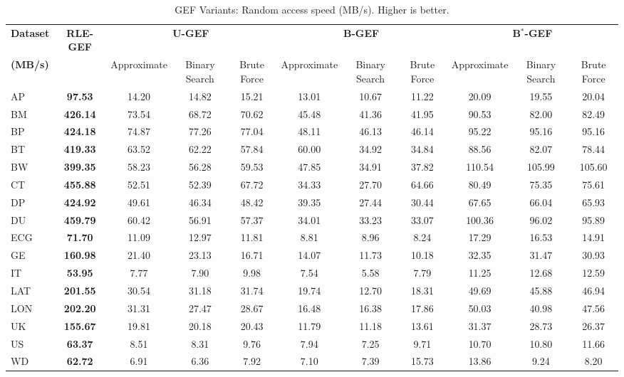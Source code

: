 \begin{table*}[htbp]
\caption{GEF Variants: Random access speed (MB/s). Higher is better.}
\label{tab:gef_access}
\centering
\small
\setlength{\tabcolsep}{4pt} %
\begin{tabular}{lcccccccccc}
\toprule
\textbf{Dataset} & \textbf{RLE-GEF} & \multicolumn{3}{c}{\textbf{U-GEF}} & \multicolumn{3}{c}{\textbf{B-GEF}} & \multicolumn{3}{c}{\textbf{B$^*$-GEF}} \\
\textbf{(MB/s)} &   & Approximate & Binary Search & Brute Force & Approximate & Binary Search & Brute Force & Approximate & Binary Search & Brute Force \\
\cmidrule(lr){3-5} \cmidrule(lr){6-8} \cmidrule(lr){9-11} 
\midrule
AP & \textbf{97.53} & 14.20 & 14.82 & 15.21 & 13.01 & 10.67 & 11.22 & 20.09 & 19.55 & 20.04 \\
BM & \textbf{426.14} & 73.54 & 68.72 & 70.62 & 45.48 & 41.36 & 41.95 & 90.53 & 82.00 & 82.49 \\
BP & \textbf{424.18} & 74.87 & 77.26 & 77.04 & 48.11 & 46.13 & 46.14 & 95.22 & 95.16 & 95.16 \\
BT & \textbf{419.33} & 63.52 & 62.22 & 57.84 & 60.00 & 34.92 & 34.84 & 88.56 & 82.07 & 78.44 \\
BW & \textbf{399.35} & 58.23 & 56.28 & 59.53 & 47.85 & 34.91 & 37.82 & 110.54 & 105.99 & 105.60 \\
CT & \textbf{455.88} & 52.51 & 52.39 & 67.72 & 34.33 & 27.70 & 64.66 & 80.49 & 75.35 & 75.61 \\
DP & \textbf{424.92} & 49.61 & 46.34 & 48.42 & 39.35 & 27.44 & 30.44 & 67.65 & 66.04 & 65.93 \\
DU & \textbf{459.79} & 60.42 & 56.91 & 57.37 & 34.01 & 33.23 & 33.07 & 100.36 & 96.02 & 95.89 \\
ECG & \textbf{71.70} & 11.09 & 12.97 & 11.81 & 8.81 & 8.96 & 8.24 & 17.29 & 16.53 & 14.91 \\
GE & \textbf{160.98} & 21.40 & 23.13 & 16.71 & 14.07 & 11.73 & 10.18 & 32.35 & 31.47 & 30.93 \\
IT & \textbf{53.95} & 7.77 & 7.90 & 9.98 & 7.54 & 5.58 & 7.79 & 11.25 & 12.68 & 12.59 \\
LAT & \textbf{201.55} & 30.54 & 31.18 & 31.74 & 19.74 & 12.70 & 18.31 & 49.69 & 45.88 & 46.94 \\
LON & \textbf{202.20} & 31.31 & 27.47 & 28.67 & 16.48 & 16.38 & 17.86 & 50.03 & 40.98 & 47.56 \\
UK & \textbf{155.67} & 19.81 & 20.18 & 20.43 & 11.79 & 11.18 & 13.61 & 31.37 & 28.73 & 26.37 \\
US & \textbf{63.37} & 8.51 & 8.31 & 9.76 & 7.94 & 7.25 & 9.71 & 10.70 & 10.80 & 11.66 \\
WD & \textbf{62.72} & 6.91 & 6.36 & 7.92 & 7.10 & 7.39 & 15.73 & 13.86 & 9.24 & 8.20 \\
\bottomrule
\end{tabular}
\end{table*}
